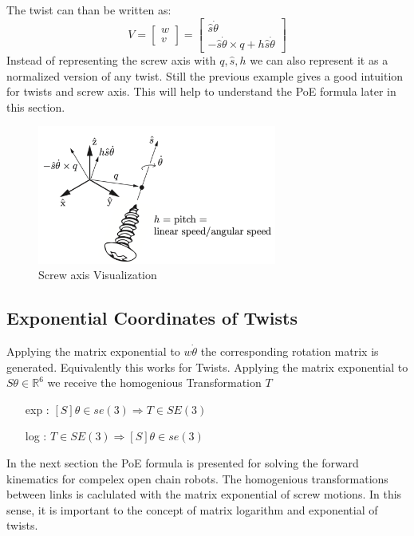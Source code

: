 \documentclass{tpk4170report}
\begin{document}
The twist can than be written as:
\[
V
=
\begin{bmatrix}
  w \\
  v
\end{bmatrix}
=
\begin{bmatrix}
  \hat{s} \dot{\theta}\\
  - \hat{s} \dot{\theta} \times q + h \hat{s} \dot{\theta}
\end{bmatrix}
\]
Instead of representing the screw axis with \(q, \hat{s}, h\) we can also represent it as a normalized version of any twist. Still the previous example gives a good intuition for twists and screw axis. This will help to understand the PoE formula later in this section. 



\begin{figure}
  \centering
  \includegraphics[width=0.7\textwidth]{assets/Twist.pdf} 
  \caption{Screw axis Visualization \cite{Lynch2017}}
  \label{fig:Twist}
\end{figure}

\subsection{Exponential Coordinates of Twists}
Applying the matrix exponential to \( w \dot{\theta}\) the corresponding rotation matrix is generated. Equivalently this works for Twists. Applying the matrix exponential to \( S \theta \in \mathbb{R}^{6} \) we receive the homogenious Transformation \( T\)

\begin{itemize}
  \item[exp]: \([S] \theta \in se(3) \Rightarrow T \in SE(3)\)
  \item[log]: \(T \in SE(3) \Rightarrow [S] \theta \in se(3)\)
\end{itemize}

In the next section the PoE formula is presented for solving the forward kinematics for compelex open chain robots. The homogenious transformations between links is caclulated with the matrix exponential of screw motions. In this sense, it is important to the concept of matrix logarithm and exponential of twists. 
\end{document}
